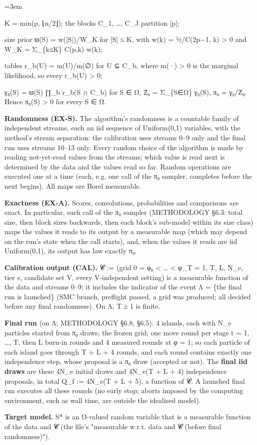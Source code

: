 \documentclass[11pt]{report}
\newcommand{\mdlbl}[1]{\textup{#1}}
\newenvironment{mdblock}{\begingroup\mdfont\raggedright\setlength{\parindent}{0pt}\setlength{\parskip}{0.55em}\emergencystretch=3em}{\par\endgroup}
\begin{document}
\begin{mdblock}
\begin{mdnum}
\begin{mdbul}
\item K = min(p, ⌊n/2⌋); the blocks C\_1, …, C\_J partition [p];
\item size prior ϖ(S) = w(|S|)/W\_K for |S| ≤ K, with w(k) = ½/C(2p−1, k) > 0 and W\_K = Σ\_\{k≤K\} C(p,k) w(k);
\item tables r\_b(U) = m(U)/m(∅) for U ⊆ C\_b, where m(·) > 0 is the marginal likelihood, so every r\_b(U) > 0;
\item γ₀(S) = ϖ(S) ∏\_b r\_b(S ∩ C\_b) for S ∈ Ω, Z̄₀ = Σ\_\{S∈Ω\} γ₀(S), π₀ = γ₀/Z̄₀. Hence π₀(S) > 0 for every S ∈ Ω.
\end{mdbul}
\item[\mdlbl{2.}] \textbf{Randomness (EX-S).} The algorithm's randomness is a countable family of independent streams, each an iid sequence of Uniform(0,1) variables, with the method's stream separation: the calibration uses streams 0–9 only and the final run uses streams 10–13 only. Every random choice of the algorithm is made by reading not-yet-read values from the streams; which value is read next is determined by the data and the values read so far. Random operations are executed one at a time (each, e.g. one call of the π₀ sampler, completes before the next begins). All maps are Borel measurable.
\item[\mdlbl{3.}] \textbf{Exactness (EX-A).} Scores, convolutions, probabilities and comparisons are exact. In particular, each call of the π₀ sampler (METHODOLOGY §6.3: total size, then block sizes backwards, then each block's sub-model within its size class) maps the values it reads to its output by a measurable map (which may depend on the run's state when the call starts), and, when the values it reads are iid Uniform(0,1), its output has law exactly π₀.
\item[\mdlbl{4.}] \textbf{Calibration output (CAL).} 𝓒 := (grid 0 = φ₀ < … < φ\_T = 1, T, L, N\_e, tier e, candidate set V, every V-independent setting) is a measurable function of the data and streams 0–9; it includes the indicator of the event Λ = \{the final run is launched\} (SMC branch, preflight passed, a grid was produced; all decided before any final randomness). On Λ, T ≥ 1 is finite.
\item[\mdlbl{5.}] \textbf{Final run} (on Λ; METHODOLOGY §6.8, §6.5). 4 islands, each with N\_e particles started from π₀ draws; the frozen grid; one move round per stage t = 1, …, T, then L burn-in rounds and 4 measured rounds at φ = 1; so each particle of each island goes through T + L + 4 rounds, and each round contains exactly one independence step, whose proposal is a π₀ draw (accepted or not). The \textbf{final iid draws} are these 4N\_e initial draws and 4N\_e(T + L + 4) independence proposals, in total Q\_f := 4N\_e(T + L + 5), a function of 𝓒. A launched final run executes all these rounds (no early stop; aborts imposed by the computing environment, such as wall time, are outside the idealised model).
\item[\mdlbl{6.}] \textbf{Target model.} S* is an Ω-valued random variable that is a measurable function of the data and 𝓒 (the file's "measurable w.r.t. data and 𝓒 (before final randomness)").
\end{mdnum}


\end{mdblock}
\end{document}
